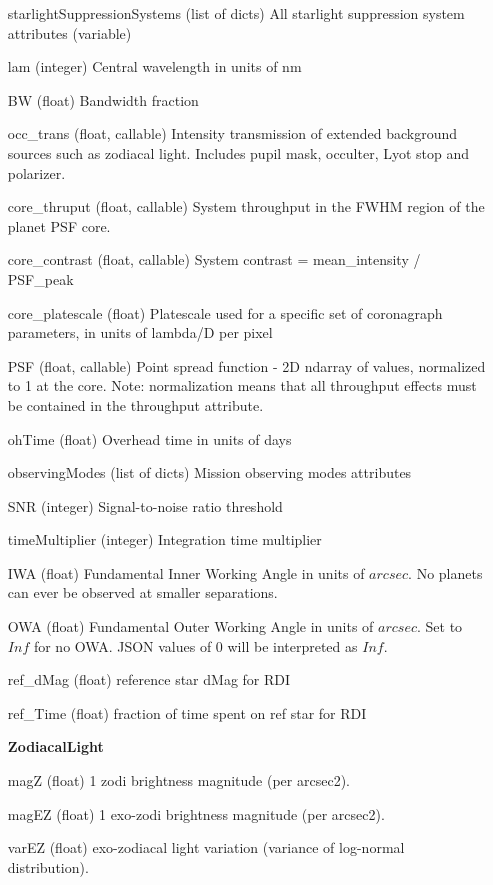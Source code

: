 \documentclass[cleanfoot]{asme2ej}
\begin{document}
\begin{itemize}[leftmargin=1.5in,font={\ttfamily}]
\item[starlightSuppressionSystems] (list of dicts) All starlight suppression system attributes (variable)
\item[lam] (integer) Central wavelength in units of nm
\item[BW] (float) Bandwidth fraction
\item[occ\_trans] (float, callable) Intensity transmission of extended background sources such as zodiacal light. Includes pupil mask, occulter, Lyot stop and polarizer.
\item[core\_thruput] (float, callable) System throughput in the FWHM region of the planet PSF core.
\item[core\_contrast] (float, callable) System contrast = mean\_intensity / PSF\_peak
\item[core\_platescale] (float) Platescale used for a specific set of coronagraph parameters, in units of lambda/D per pixel
\item[PSF] (float, callable) Point spread function - 2D ndarray of values, normalized to 1 at the core. Note: normalization means that all throughput effects must be contained in the throughput attribute.
\item[ohTime] (float) Overhead time in units of days
\item[observingModes] (list of dicts) Mission observing modes attributes
\item[SNR] (integer) Signal-to-noise ratio threshold
\item[timeMultiplier] (integer) Integration time multiplier
\item[IWA] (float) Fundamental Inner Working Angle in units of $ arcsec $. No planets can ever be observed at smaller separations.
\item[OWA] (float) Fundamental Outer Working Angle in units of $ arcsec $. Set to $ Inf $ for no OWA. JSON values of 0 will be interpreted as $ Inf $.
\item[ref\_dMag] (float) reference star dMag for RDI
\item[ref\_Time] (float) fraction of time spent on ref star for RDI

\item[\textbf{ZodiacalLight}]
\item[magZ] (float) 1 zodi brightness magnitude (per arcsec2).
\item[magEZ] (float) 1 exo-zodi brightness magnitude (per arcsec2).
\item[varEZ] (float) exo-zodiacal light variation (variance of log-normal distribution).


\end{itemize}
\end{document}
